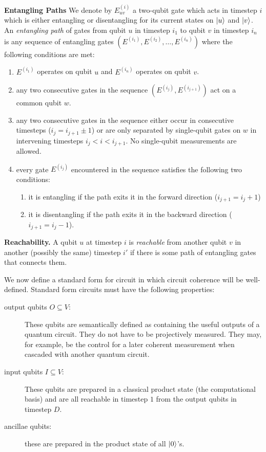 \begin{definition}{\textbf{Entangling Paths}}
We denote by $E^{(i)}_{uv}$ a two-qubit gate which acts in
timestep $i$ which is either entangling or disentangling for its current states on $\left\vert{u}\right\rangle$ and $\left\vert{v}\right\rangle$.
An \emph{entangling path} of gates from qubit $u$ in timestep $i_1$ to
qubit $v$ in timestep $i_n$ is
any sequence of entangling gates $(E^{(i_1)}, E^{(i_2)}, \ldots, E^{(i_n)})$
where the following conditions are met:

\begin{enumerate}
\item
$E^{(i_1)}$ operates on qubit $u$ and $E^{(i_n)}$ operates on qubit $v$.

\item
any two consecutive gates in the sequence $(E^{(i_j)},E^{(i_{j+1})})$
act on a common qubit $w$.
\item
any two consecutive gates in the sequence either occur in
consecutive timesteps ($i_j = i_{j+1} \pm 1$) or are only separated by
single-qubit gates on $w$ in intervening timesteps $i_j < i < i_{j+1}$.
No single-qubit measurements are allowed.
\item
every gate $E^{(i_j)}$ encountered in the sequence satisfies the
following two conditions:

\begin{enumerate}
\item it is entangling if
the path exits it in the forward direction ($i_{j+1} = i_j + 1$)
\item it is disentangling if the path exits it in the backward direction
($i_{j+1} = i_j - 1$).
\end{enumerate}
\end{enumerate}

\end{definition}

\begin{definition}{\textbf{Reachability.}}
A qubit $u$ at timestep $i$ is \emph{reachable} from another qubit $v$ in
another (possibly the same) timestep $i'$ if there is some path of entangling gates that
connects them.
\end{definition}

We now define a standard form for circuit in which circuit coherence will be
well-defined. Standard form circuits must have the following properties:

\begin{description}
\item[output qubits $O \subseteq V$:] These qubits are semantically defined as
containing the useful outputs of a quantum circuit. They do not have to be
projectively measured. They may, for example, be the control for a
later coherent measurement when cascaded with another quantum circuit.
\item[input qubits $I \subseteq V$:] These qubits are prepared in a 
classical product state (the computational basis)
and are all reachable in timestep $1$ from the
output qubits in timestep $D$.
\item[ancillae qubits:] these are prepared in the product state of all $\left\vert{0}\right\rangle$'s.
\end{description}

